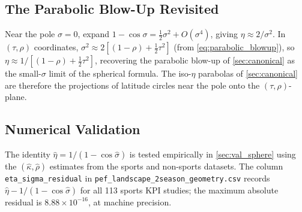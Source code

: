 \subsection{The Parabolic Blow-Up Revisited}

Near the pole $\sigma = 0$, expand $1 - \cos\sigma = \tfrac{1}{2}\sigma^{2} + O(\sigma^{4})$, giving $\eta \approx 2/\sigma^{2}$.  In $(\tau,\rho)$ coordinates, $\sigma^{2} \approx 2[(1-\rho) + \tfrac{1}{2}\tau^{2}]$ (from \cref{eq:parabolic_blowup}), so $\eta \approx 1/[(1-\rho)+\tfrac{1}{2}\tau^{2}]$, recovering the parabolic blow-up of \cref{sec:canonical} as the small-$\sigma$ limit of the spherical formula.  The iso-$\eta$ parabolas of \cref{sec:canonical} are therefore the projections of latitude circles near the pole onto the $(\tau,\rho)$-plane.

\subsection{Numerical Validation}
\label{sec:sphere_numerical_preview}

The identity $\hat\eta = 1/(1-\cos\hat\sigma)$ is tested empirically in \cref{sec:val_sphere} using the $(\hat\kappa,\hat\rho)$ estimates from the sports and non-sports datasets.  The column \texttt{eta\_sigma\_residual} in \texttt{pef\_landscape\_2season\_geometry.csv} records $\hat\eta - 1/(1-\cos\hat\sigma)$ for all 113 sports KPI studies; the maximum absolute residual is $8.88\times10^{-16}$, at machine precision.
